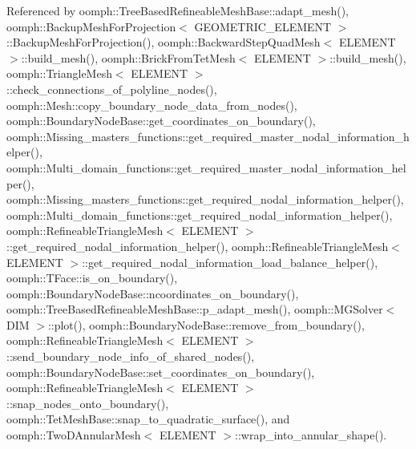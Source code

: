 Referenced by oomph\+::\+Tree\+Based\+Refineable\+Mesh\+Base\+::adapt\+\_\+mesh(), oomph\+::\+Backup\+Mesh\+For\+Projection$<$ G\+E\+O\+M\+E\+T\+R\+I\+C\+\_\+\+E\+L\+E\+M\+E\+N\+T $>$\+::\+Backup\+Mesh\+For\+Projection(), oomph\+::\+Backward\+Step\+Quad\+Mesh$<$ E\+L\+E\+M\+E\+N\+T $>$\+::build\+\_\+mesh(), oomph\+::\+Brick\+From\+Tet\+Mesh$<$ E\+L\+E\+M\+E\+N\+T $>$\+::build\+\_\+mesh(), oomph\+::\+Triangle\+Mesh$<$ E\+L\+E\+M\+E\+N\+T $>$\+::check\+\_\+connections\+\_\+of\+\_\+polyline\+\_\+nodes(), oomph\+::\+Mesh\+::copy\+\_\+boundary\+\_\+node\+\_\+data\+\_\+from\+\_\+nodes(), oomph\+::\+Boundary\+Node\+Base\+::get\+\_\+coordinates\+\_\+on\+\_\+boundary(), oomph\+::\+Missing\+\_\+masters\+\_\+functions\+::get\+\_\+required\+\_\+master\+\_\+nodal\+\_\+information\+\_\+helper(), oomph\+::\+Multi\+\_\+domain\+\_\+functions\+::get\+\_\+required\+\_\+master\+\_\+nodal\+\_\+information\+\_\+helper(), oomph\+::\+Missing\+\_\+masters\+\_\+functions\+::get\+\_\+required\+\_\+nodal\+\_\+information\+\_\+helper(), oomph\+::\+Multi\+\_\+domain\+\_\+functions\+::get\+\_\+required\+\_\+nodal\+\_\+information\+\_\+helper(), oomph\+::\+Refineable\+Triangle\+Mesh$<$ E\+L\+E\+M\+E\+N\+T $>$\+::get\+\_\+required\+\_\+nodal\+\_\+information\+\_\+helper(), oomph\+::\+Refineable\+Triangle\+Mesh$<$ E\+L\+E\+M\+E\+N\+T $>$\+::get\+\_\+required\+\_\+nodal\+\_\+information\+\_\+load\+\_\+balance\+\_\+helper(), oomph\+::\+T\+Face\+::is\+\_\+on\+\_\+boundary(), oomph\+::\+Boundary\+Node\+Base\+::ncoordinates\+\_\+on\+\_\+boundary(), oomph\+::\+Tree\+Based\+Refineable\+Mesh\+Base\+::p\+\_\+adapt\+\_\+mesh(), oomph\+::\+M\+G\+Solver$<$ D\+I\+M $>$\+::plot(), oomph\+::\+Boundary\+Node\+Base\+::remove\+\_\+from\+\_\+boundary(), oomph\+::\+Refineable\+Triangle\+Mesh$<$ E\+L\+E\+M\+E\+N\+T $>$\+::send\+\_\+boundary\+\_\+node\+\_\+info\+\_\+of\+\_\+shared\+\_\+nodes(), oomph\+::\+Boundary\+Node\+Base\+::set\+\_\+coordinates\+\_\+on\+\_\+boundary(), oomph\+::\+Refineable\+Triangle\+Mesh$<$ E\+L\+E\+M\+E\+N\+T $>$\+::snap\+\_\+nodes\+\_\+onto\+\_\+boundary(), oomph\+::\+Tet\+Mesh\+Base\+::snap\+\_\+to\+\_\+quadratic\+\_\+surface(), and oomph\+::\+Two\+D\+Annular\+Mesh$<$ E\+L\+E\+M\+E\+N\+T $>$\+::wrap\+\_\+into\+\_\+annular\+\_\+shape().

\mbox{\label{classoomph_1_1Node_ad1341e137f63f0c4df88844957665cc9}} 

